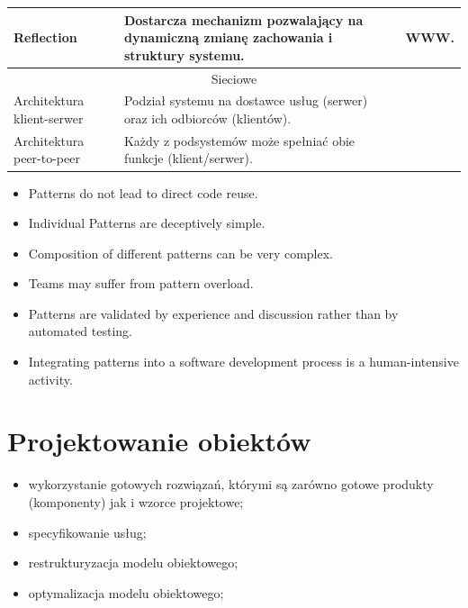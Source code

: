 \documentclass[a4paper]{article}
\begin{document}
\begin{table}[H]
\begin{center}
\begin{tabular}{ p{} p{} p{}}
                \cmidrule(l){1-3}

                Reflection &
                Dostarcza mechanizm pozwalający na dynamiczną zmianę zachowania i struktury systemu.
                & WWW.\\

                \toprule
                \multicolumn{3}{c}{Sieciowe}\\
                \toprule

                Architektura klient-serwer
                &
                Podział systemu na dostawce usług (serwer) oraz ich odbiorców (klientów).
                & \\

                \cmidrule(l){1-3}

                Architektura peer-to-peer
                &
                Każdy z podsystemów może spełniać obie funkcje (klient/serwer).
                & \\

                \bottomrule
            \end{tabular}
        \end{center}
    \end{table}

    \begin{itemize}
        \item Patterns do not lead to direct code reuse.
        \item Individual Patterns are deceptively simple.
        \item Composition of different patterns can be very complex.
        \item Teams may suffer from pattern overload.
        \item Patterns are validated by experience and discussion
        rather than by automated testing.
        \item Integrating patterns into a software development
        process is a human-intensive activity.
    \end{itemize}



    \section{Projektowanie obiektów}
    \begin{itemize}
        \item wykorzystanie gotowych rozwiązań, którymi są zarówno
        gotowe produkty (komponenty) jak i wzorce projektowe;
        \item specyfikowanie usług;
        \item restrukturyzacja modelu obiektowego;
        \item optymalizacja modelu obiektowego;
    \end{itemize}
\end{document}
